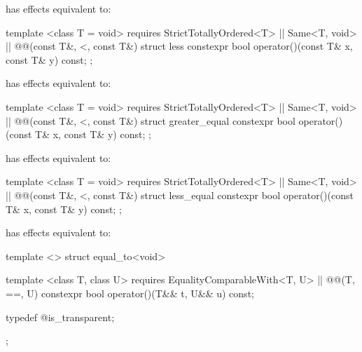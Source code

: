 \begin{itemdescr}
\pnum
{} has effects equivalent to: 
\end{itemdescr}

%
\begin{itemdecl}
template <class T = void>
  requires StrictTotallyOrdered<T> || Same<T, void> || @\textit{}@(const T&, <, const T&)
struct less {
  constexpr bool operator()(const T& x, const T& y) const;
};
\end{itemdecl}

\begin{itemdescr}
\pnum
{} has effects equivalent to: 
\end{itemdescr}

%
\begin{itemdecl}
template <class T = void>
  requires StrictTotallyOrdered<T> || Same<T, void> || @\textit{}@(const T&, <, const T&)
struct greater_equal {
  constexpr bool operator()(const T& x, const T& y) const;
};
\end{itemdecl}

\begin{itemdescr}
\pnum
{} has effects equivalent to: 
\end{itemdescr}

%
\begin{itemdecl}
template <class T = void>
  requires StrictTotallyOrdered<T> || Same<T, void> || @\textit{}@(const T&, <, const T&)
struct less_equal {
  constexpr bool operator()(const T& x, const T& y) const;
};
\end{itemdecl}

\begin{itemdescr}
\pnum
{} has effects equivalent to: 
\end{itemdescr}

%
\begin{itemdecl}
template <> struct equal_to<void> {
  template <class T, class U>
    requires EqualityComparableWith<T, U> || @\textit{}@(T, ==, U)
  constexpr bool operator()(T&& t, U&& u) const;

  typedef @\unspec@ is_transparent;
};
\end{itemdecl}

